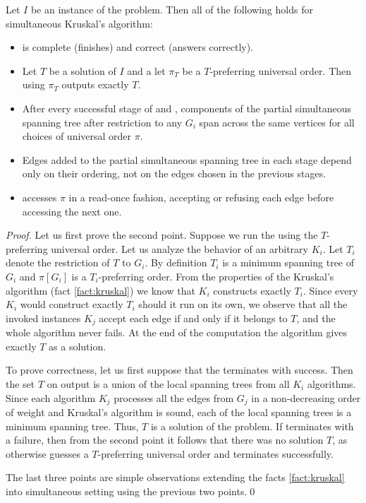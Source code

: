 \begin{lemma}\label{lem:ska}
Let $I$ be an instance of the \SMST problem. Then all of the following holds for simultaneous Kruskal's algorithm: 

\begin{itemize}
    \item \NSKA is complete (finishes) and correct (answers correctly).  
    \item Let $T$ be a solution of $I$ and a let $\pi_T$ be a $T$-preferring universal order. Then \SKA using $\pi_T$ outputs exactly $T$. 
    \item After every successful stage of \SKA and \NSKA, components of the partial simultaneous spanning tree after restriction to any $G_i$ span across the same vertices for all choices of universal order $\pi$. 
    \item Edges added to the partial simultaneous spanning tree in each stage depend only on their ordering, not on the edges chosen in the previous stages. 
    \item \SKA accesses $\pi$ in a read-once fashion, accepting or refusing each edge before accessing the next one. 
\end{itemize}
\end{lemma}
\begin{proof}
Let us first prove the second point. Suppose we run the \SKA using the $T$-preferring universal order. Let us analyze the behavior of an arbitrary $K_i$. Let $T_i$ denote the restriction of $T$ to $G_i$. By definition $T_i$ is a minimum spanning tree of $G_i$ and $\pi[G_i]$ is a $T_i$-preferring order. From the properties of the Kruskal's algorithm (fact \ref{fact:kruskal}) we know that $K_i$ constructs exactly $T_i$. Since every $K_i$ would construct exactly $T_i$ should it run on its own, we observe that all the invoked instances $K_j$ accept each edge if and only if it belongs to $T$, and the whole algorithm never fails. At the end of the computation the algorithm gives exactly $T$ as a solution. 

To prove correctness, let us first suppose that the \NSKA terminates with success. Then the set $T$ on output is a union of the local spanning trees from all $K_i$ algorithms. Since each algorithm $K_j$ processes all the edges from $G_j$ in a non-decreasing order of weight and Kruskal's algorithm is sound, each of the local spanning trees is a minimum spanning tree. Thus, $T$ is a solution of the \SMST problem. If \NSKA terminates with a failure, then from the second point it follows that there was no solution $T$, as otherwise \NSKA guesses a $T$-preferring universal order and terminates successfully.

The last three points are simple observations extending the facts \ref{fact:kruskal} into simultaneous setting using the previous two points.\qed
\end{proof}
